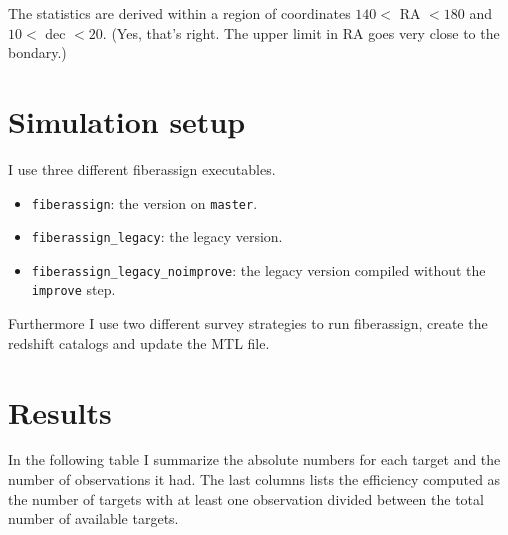 \documentclass{article}
\begin{document}
The statistics are derived within a region of coordinates 
$140<$ RA $<180$ and
$10<$ dec $<20$. (Yes, that's right. The upper limit in RA goes very
close to the bondary.)

\section{Simulation setup}

I use three different fiberassign executables.
\begin{itemize}
\item \verb"fiberassign": the version on \verb'master'.
\item \verb"fiberassign_legacy": the legacy version.
\item \verb'fiberassign_legacy_noimprove': the legacy version compiled
without the \verb'improve' step.
\end{itemize}

Furthermore I use two different survey strategies to run fiberassign, 
create the redshift catalogs and update the MTL file.

\section{Results}

In the following table I summarize the absolute numbers for 
each target and the number of observations it had. The last columns
lists the efficiency computed as the number of targets with at least
one observation divided between the total number of available targets.
\end{document}
